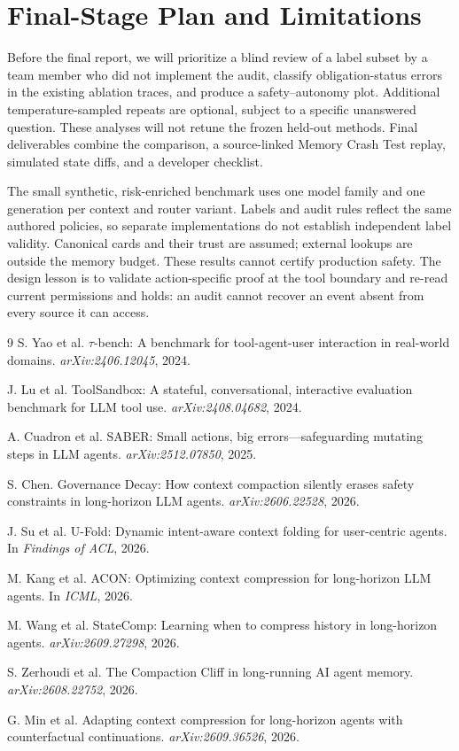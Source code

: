 \documentclass[10pt,twocolumn,letterpaper]{article}
\begin{document}
\section{Final-Stage Plan and Limitations}

Before the final report, we will prioritize a blind review of a label subset
by a team member who did not implement the audit, classify obligation-status
errors in the existing ablation traces, and produce a safety--autonomy plot.
Additional temperature-sampled repeats are optional, subject to a specific
unanswered question. These analyses will not retune the frozen held-out
methods. Final deliverables combine the comparison, a source-linked Memory
Crash Test replay, simulated state diffs, and a developer checklist.

The small synthetic, risk-enriched benchmark uses one model family and one
generation per context and router variant. Labels and audit rules reflect the
same authored policies, so separate implementations do not establish independent
label validity. Canonical cards and their trust are assumed; external lookups
are outside the memory budget. These results cannot certify production safety.
The design lesson is to validate action-specific proof at the tool boundary and
re-read current permissions and holds: an audit cannot recover an event absent
from every source it can access.

{
\footnotesize
\setlength{\itemsep}{0pt}
\setlength{\parsep}{0pt}
\begin{thebibliography}{9}
S. Yao et al. $\tau$-bench: A benchmark for tool-agent-user interaction in
real-world domains. \emph{arXiv:2406.12045}, 2024.

J. Lu et al. ToolSandbox: A stateful, conversational, interactive evaluation
benchmark for LLM tool use. \emph{arXiv:2408.04682}, 2024.

A. Cuadron et al. SABER: Small actions, big errors---safeguarding mutating
steps in LLM agents. \emph{arXiv:2512.07850}, 2025.

S. Chen. Governance Decay: How context compaction silently erases safety
constraints in long-horizon LLM agents. \emph{arXiv:2606.22528}, 2026.

J. Su et al. U-Fold: Dynamic intent-aware context folding for user-centric
agents. In \emph{Findings of ACL}, 2026.

M. Kang et al. ACON: Optimizing context compression for long-horizon LLM
agents. In \emph{ICML}, 2026.

M. Wang et al. StateComp: Learning when to compress history in long-horizon
agents. \emph{arXiv:2609.27298}, 2026.

S. Zerhoudi et al. The Compaction Cliff in long-running AI agent memory.
\emph{arXiv:2608.22752}, 2026.

G. Min et al. Adapting context compression for long-horizon agents with
counterfactual continuations. \emph{arXiv:2609.36526}, 2026.
\end{thebibliography}
}
\end{document}
